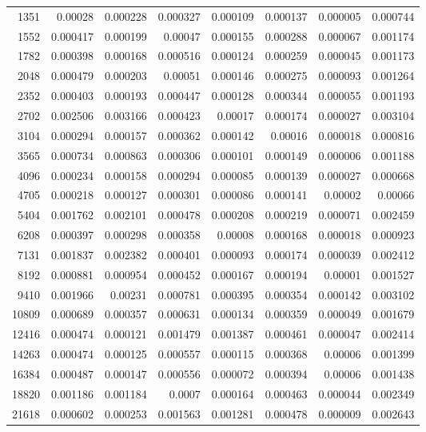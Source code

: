 \begin{tabular}{r r r r r r r r}
1351 & 0.00028 & 0.000228 & 0.000327 & 0.000109 & 0.000137 & 0.000005 & 0.000744 \\
1552 & 0.000417 & 0.000199 & 0.00047 & 0.000155 & 0.000288 & 0.000067 & 0.001174 \\
1782 & 0.000398 & 0.000168 & 0.000516 & 0.000124 & 0.000259 & 0.000045 & 0.001173 \\
2048 & 0.000479 & 0.000203 & 0.00051 & 0.000146 & 0.000275 & 0.000093 & 0.001264 \\
2352 & 0.000403 & 0.000193 & 0.000447 & 0.000128 & 0.000344 & 0.000055 & 0.001193 \\
2702 & 0.002506 & 0.003166 & 0.000423 & 0.00017 & 0.000174 & 0.000027 & 0.003104 \\
3104 & 0.000294 & 0.000157 & 0.000362 & 0.000142 & 0.00016 & 0.000018 & 0.000816 \\
3565 & 0.000734 & 0.000863 & 0.000306 & 0.000101 & 0.000149 & 0.000006 & 0.001188 \\
4096 & 0.000234 & 0.000158 & 0.000294 & 0.000085 & 0.000139 & 0.000027 & 0.000668 \\
4705 & 0.000218 & 0.000127 & 0.000301 & 0.000086 & 0.000141 & 0.00002 & 0.00066 \\
5404 & 0.001762 & 0.002101 & 0.000478 & 0.000208 & 0.000219 & 0.000071 & 0.002459 \\
6208 & 0.000397 & 0.000298 & 0.000358 & 0.00008 & 0.000168 & 0.000018 & 0.000923 \\
7131 & 0.001837 & 0.002382 & 0.000401 & 0.000093 & 0.000174 & 0.000039 & 0.002412 \\
8192 & 0.000881 & 0.000954 & 0.000452 & 0.000167 & 0.000194 & 0.00001 & 0.001527 \\
9410 & 0.001966 & 0.00231 & 0.000781 & 0.000395 & 0.000354 & 0.000142 & 0.003102 \\
10809 & 0.000689 & 0.000357 & 0.000631 & 0.000134 & 0.000359 & 0.000049 & 0.001679 \\
12416 & 0.000474 & 0.000121 & 0.001479 & 0.001387 & 0.000461 & 0.000047 & 0.002414 \\
14263 & 0.000474 & 0.000125 & 0.000557 & 0.000115 & 0.000368 & 0.00006 & 0.001399 \\
16384 & 0.000487 & 0.000147 & 0.000556 & 0.000072 & 0.000394 & 0.00006 & 0.001438 \\
18820 & 0.001186 & 0.001184 & 0.0007 & 0.000164 & 0.000463 & 0.000044 & 0.002349 \\
21618 & 0.000602 & 0.000253 & 0.001563 & 0.001281 & 0.000478 & 0.000009 & 0.002643 \\

\end{tabular}
